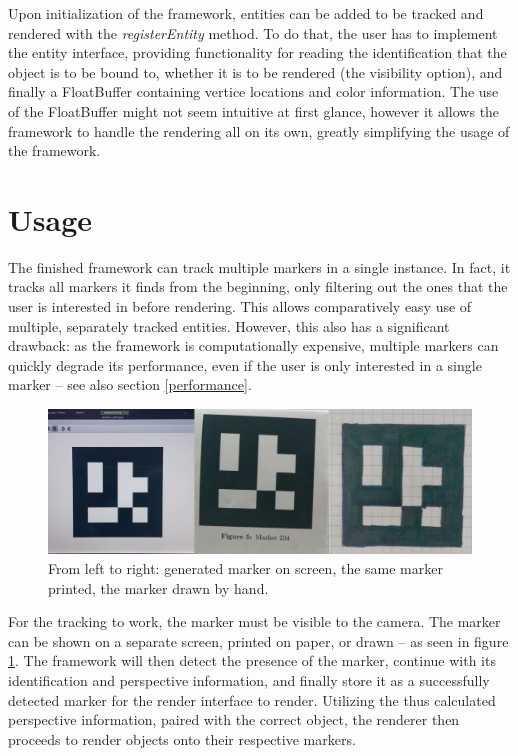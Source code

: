 Upon initialization of the framework, entities can be added to be tracked and rendered with the \textit{registerEntity} method.
To do that, the user has to implement the entity interface, providing functionality for reading the identification that the object is to be bound to, whether it is to be rendered (the visibility option), and finally a FloatBuffer containing vertice locations and color information.
The use of the FloatBuffer might not seem intuitive at first glance, however it allows the framework to handle the rendering all on its own, greatly simplifying the usage of the framework.

\section{Usage}

The finished framework can track multiple markers in a single instance.
In fact, it tracks all markers it finds from the beginning, only filtering out the ones that the user is interested in before rendering.
This allows comparatively easy use of multiple, separately tracked entities.
However, this also has a significant drawback: as the framework is computationally expensive, multiple markers can quickly degrade its performance, even if the user is only interested in a single marker – see also section \ref{performance}.

\begin{figure}[H]
	\centering
	\includegraphics[width=12cm]{img/mult_marker.png}
	\caption[Usage Forms of Markers]{From left to right: generated marker on screen, the same marker printed, the marker drawn by hand.}
	\label{fig:mult_markers}
\end{figure}

For the tracking to work, the marker must be visible to the camera.
The marker can be shown on a separate screen, printed on paper, or drawn – as seen in figure \ref{fig:mult_markers}.
The framework will then detect the presence of the marker, continue with its identification and perspective information, and finally store it as a successfully detected marker for the render interface to render.
Utilizing the thus calculated perspective information, paired with the correct object, the renderer then proceeds to render objects onto their respective markers.

